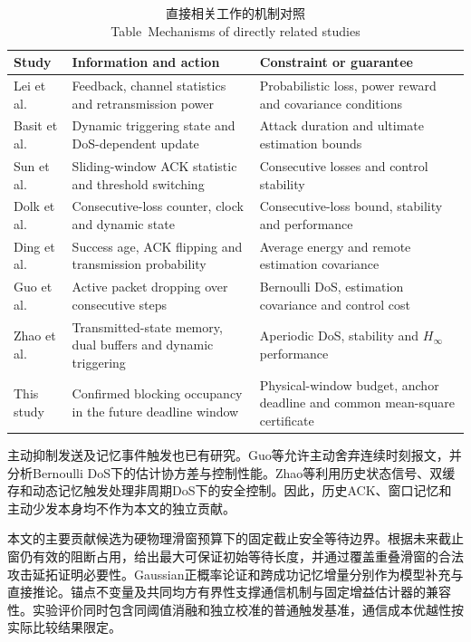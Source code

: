 \documentclass[UTF8,a4paper,zihao=5,fontset=windows]{ctexart}
\begin{document}
\begin{table}[htbp]
\centering\small
\caption{直接相关工作的机制对照\\ Table~\thetable\quad Mechanisms of directly related studies}\label{tab:related}
\begin{tabularx}{\linewidth}{p{25mm}>{\raggedright\arraybackslash}X>{\raggedright\arraybackslash}X}
\toprule
Study & Information and action & Constraint or guarantee\\
\midrule
Lei et al.\cite{Paper_FUS42_2022} & Feedback, channel statistics and retransmission power & Probabilistic loss, power reward and covariance conditions\\
Basit et al.\cite{Paper_FUS37_2023} & Dynamic triggering state and DoS-dependent update & Attack duration and ultimate estimation bounds\\
Sun et al.\cite{Paper_FUS06_Sun2024} & Sliding-window ACK statistic and threshold switching & Consecutive losses and control stability\\
Dolk et al.\cite{Paper_FUS47_2017} & Consecutive-loss counter, clock and dynamic state & Consecutive-loss bound, stability and performance\\
Ding et al.\cite{Paper_FUS48_Ding2016} & Success age, ACK flipping and transmission probability & Average energy and remote estimation covariance\\
Guo et al.\cite{Paper_FUS46_2020} & Active packet dropping over consecutive steps & Bernoulli DoS, estimation covariance and control cost\\
Zhao et al.\cite{Paper_FUS50_Zhao2024} & Transmitted-state memory, dual buffers and dynamic triggering & Aperiodic DoS, stability and $H_\infty$ performance\\
This study & Confirmed blocking occupancy in the future deadline window & Physical-window budget, anchor deadline and common mean-square certificate\\
\bottomrule
\end{tabularx}
\end{table}

主动抑制发送及记忆事件触发也已有研究。Guo等允许主动舍弃连续时刻报文，并分析Bernoulli DoS下的估计协方差与控制性能\cite{Paper_FUS46_2020}。Zhao等利用历史状态信号、双缓存和动态记忆触发处理非周期DoS下的安全控制\cite{Paper_FUS50_Zhao2024}。因此，历史ACK、窗口记忆和主动少发本身均不作为本文的独立贡献。

本文的主要贡献候选为硬物理滑窗预算下的固定截止安全等待边界。根据未来截止窗仍有效的阻断占用，给出最大可保证初始等待长度，并通过覆盖重叠滑窗的合法攻击延拓证明必要性。Gaussian正概率论证和跨成功记忆增量分别作为模型补充与直接推论。锚点不变量及共同均方有界性支撑通信机制与固定增益估计器的兼容性。实验评价同时包含同阈值消融和独立校准的普通触发基准，通信成本优越性按实际比较结果限定。
\end{document}
